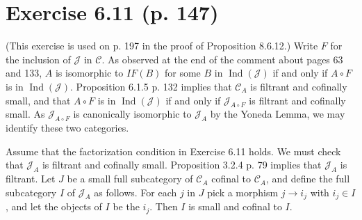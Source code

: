 \documentclass[12pt]{article}
\theoremstyle{remark}
\newcommand{\C}{\mathcal C}
\newcommand{\J}{\mathcal J}
\DeclareMathOperator{\Ind}{Ind}
\begin{document}
%
\section{Exercise 6.11 (p. 147)}%
%
(This exercise is used on p. 197 in the proof of Proposition 8.6.12.) Write $F$ for the inclusion of $\J$ in $\C$. As observed at the end of the comment about pages 63 and 133, $A$ is isomorphic to $IF(B)$ for some $B$ in $\Ind(\J)$ if and only if $A\circ F$ is in $\Ind(\J)$. Proposition 6.1.5 p. 132 implies that $\C_A$ is filtrant and cofinally small, and that $A\circ F$ is in $\Ind(\J)$ if and only if $\J_{A\circ F}$ is filtrant and cofinally small. As $\J_{A\circ F}$ is canonically isomorphic to $\J_A$ by the Yoneda Lemma, we may identify these two categories. 

Assume that the factorization condition in Exercise 6.11 holds. We must check that $\J_A$ is filtrant and cofinally small. Proposition 3.2.4 p. 79 implies that $\J_A$ is filtrant. Let $J$ be a small full subcategory of $\C_A$ cofinal to $\C_A$, and define the full subcategory $I$ of $\J_A$ as follows. For each $j$ in $J$ pick a morphism $j\to i_j$ with $i_j\in I$, and let the objects of $I$ be the $i_j$. Then $I$ is small and cofinal to $I$. 
\end{document}
